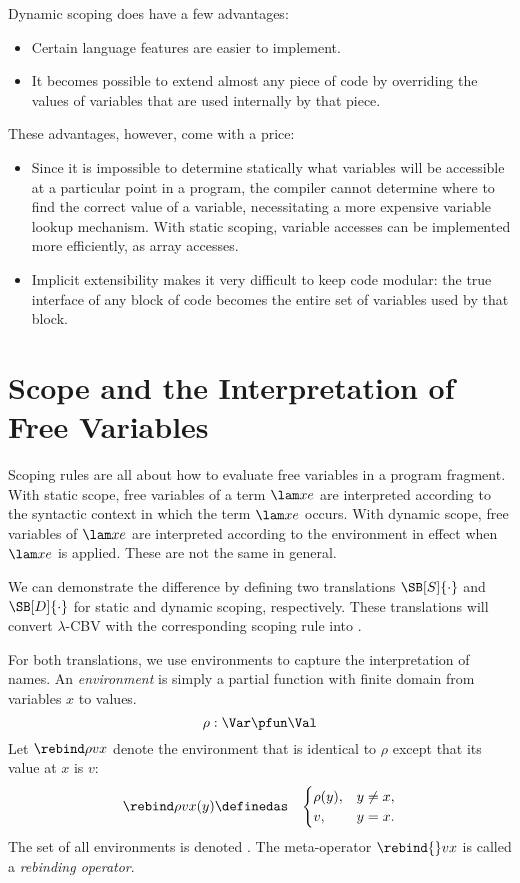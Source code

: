 Dynamic scoping does have a few advantages:
\begin{itemize}
\item Certain language features are easier to implement.
\item It becomes possible to extend almost any piece of code by overriding the values of variables that are
used internally by that piece.
\end{itemize}
These advantages, however, come with a price:
\begin{itemize}
\item Since it is impossible to determine statically what variables will be accessible at a particular point in a
program, the compiler cannot determine where to find the correct value of a variable, necessitating a
more expensive variable lookup mechanism. With static scoping, variable accesses can be implemented
more efficiently, as array accesses.
\item Implicit extensibility makes it very difficult to keep code modular: the true interface of any block of
code becomes the entire set of variables used by that block.
\end{itemize}

\section{Scope and the Interpretation of Free Variables}

Scoping rules are all about how to evaluate free variables in a
program fragment.  With static scope, free variables of a term $\lam
xe$ are interpreted according to the syntactic context in which the
term $\lam xe$ occurs.  With dynamic scope, free variables of $\lam
xe$ are interpreted according to the environment in effect when $\lam
xe$ is applied.  These are not the same in general.

We can demonstrate the difference by defining two translations
$\SB[S]{\cdot}$ and $\SB[D]{\cdot}$ for static and dynamic scoping,
respectively. These translations will convert $\lambda$-CBV with the
corresponding scoping rule into \FL.

For both translations, we use environments to capture the
interpretation of names. An \emph{environment} is simply a partial
function with finite domain from variables $x$ to values.
\[
\rho : \Var \pfun \Val
\]
Let $\rebind\rho vx$ denote the environment that is identical to
$\rho$ except that its value at $x$ is $v$:
\begin{eqnarray*}
\rebind\rho vx(y) &\definedas& \begin{cases}
\rho(y), & y\neq x,\\
v, & y=x.
\end{cases}
\end{eqnarray*}
The set of all environments is denoted \Env. The meta-operator $\rebind{}vx$ is called a \emph{rebinding operator}.

